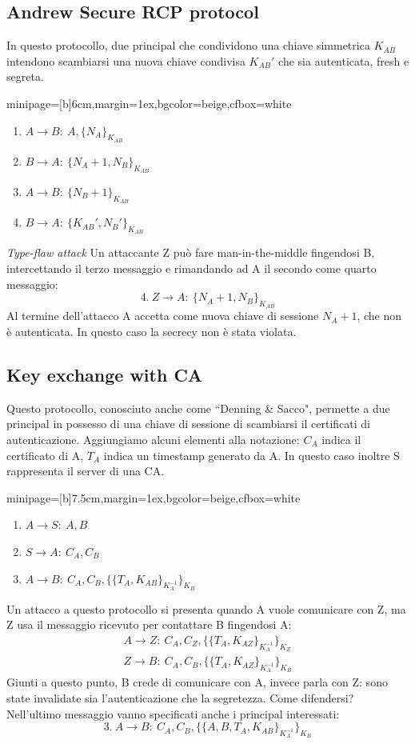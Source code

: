 \documentclass[a4paper, 11pt, twoside, openright, fleqn]{report}
\newcommand{\fromto}[2]{#1\rightarrow #2\!:\ }
\newenvironment{colbox}[2]%
{%
	\par\noindent\hspace{10pt}
	\begin{adjustbox}{minipage=[b]{#2},margin=1ex,bgcolor=#1,cfbox=white}
}{%
	\end{adjustbox}\newline%
}
\begin{document}
\subsection{Andrew Secure RCP protocol}
In questo protocollo, due principal che condividono una chiave simmetrica $K_{AB}$ intendono scambiarsi una nuova chiave condivisa $K_{AB}'$ che sia autenticata, fresh e segreta.
\begin{colbox}{beige}{6cm}
	\begin{enumerate}
		\item $\fromto{A}{B}A,\{N_A\}_{K_{AB}}$
		\item $\fromto{B}{A}\{N_A+1,N_B\}_{K_{AB}}$
		\item $\fromto{A}{B}\{N_B+1\}_{K_{AB}}$
		\item $\fromto{B}{A}\{K_{AB}',N_B'\}_{K_{AB}}$
	\end{enumerate}
\end{colbox}
\emph{Type-flaw attack}
Un attaccante Z può fare man-in-the-middle fingendosi B, intercettando il terzo messaggio e rimandando ad A il secondo come quarto messaggio:
\begin{equation*}
	4.\ \fromto{Z}{A}\{N_A+1,N_B\}_{K_{AB}}
\end{equation*}
Al termine dell'attacco A accetta come nuova chiave di sessione $N_A+1$, che non è autenticata. In questo caso la secrecy non è stata violata.

\subsection{Key exchange with CA}
Questo protocollo, conosciuto anche come ``Denning \& Sacco", permette a due principal in possesso di una chiave di sessione di scambiarsi il certificati di autenticazione. Aggiungiamo alcuni elementi alla notazione: $C_A$ indica il certificato di A, $T_A$ indica un timestamp generato da A. In questo caso inoltre S rappresenta il server di una CA.
\begin{colbox}{beige}{7.5cm}
	\begin{enumerate}
		\item $\fromto{A}{S}A,B$
		\item $\fromto{S}{A}C_A,C_B$
		\item $\fromto{A}{B}C_A,C_B,\{\{T_A,K_{AB}\}_{K_A^{-1}}\}_{K_B}$
	\end{enumerate}
\end{colbox}
Un attacco a questo protocollo si presenta quando A vuole comunicare con Z, ma Z usa il messaggio ricevuto per contattare B fingendosi A:
\begin{gather*}
	\fromto{A}{Z}C_A,C_Z,\{\{T_A,K_{AZ}\}_{K_A^{-1}}\}_{K_Z}\\
	\fromto{Z}{B}C_A,C_B,\{\{T_A,K_{AZ}\}_{K_A^{-1}}\}_{K_B}
\end{gather*}
Giunti a questo punto, B crede di comunicare con A, invece parla con Z: sono state invalidate sia l'autenticazione che la segretezza. Come difendersi?\\
Nell'ultimo messaggio vanno specificati anche i principal interessati:
\begin{equation*}
	3.\ \fromto{A}{B}C_A,C_B,\{\{A,B,T_A,K_{AB}\}_{K_A^{-1}}\}_{K_B}
\end{equation*}
\end{document}
